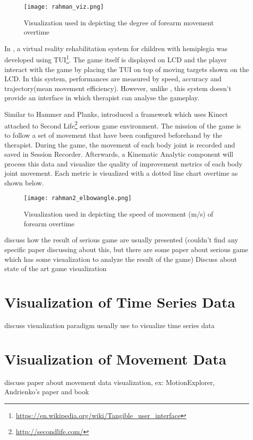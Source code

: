 \begin{figure}
\centering
\texttt{[image: rahman\_viz.png]}
\caption{Visualization used in \cite{rahman} depicting the degree of forearm movement overtime}
\end{figure}

In \cite{green}, a virtual reality rehabilitation system for children with hemiplegia was developed using TUI\footnote{\url{https://en.wikipedia.org/wiki/Tangible_user_interface}}. The game itself is displayed on LCD and the player interact with the game by placing the TUI on top of moving targets shown on the LCD. In this system, performances are measured by speed, accuracy and trajectory(mean movement efficiency). However, unlike \cite{rahman}, this system doesn't provide an interface in which therapist can analyse the gameplay.

Similar to Hammer and Planks, \cite{rahman2} introduced a framework which uses Kinect attached to Second Life\footnote{\url{http://secondlife.com/}} serious game environment. The mission of the game is to follow a set of movement that have been configured beforehand by the therapist. During the game, the movement of each body joint  is recorded and saved in Session Recorder. Afterwards, a Kinematic Analytic component will process this data and visualize the quality of improvement metrics of each body joint movement. Each metric is visualized with a dotted line chart overtime as shown below.

\begin{figure}
\centering
\texttt{[image: rahman2\_elbowangle.png]}
\caption{Visualization used in \cite{rahman2} depicting the speed of movement (m/s) of forearm overtime}
\end{figure}

discuss how the result of serious game are usually presented (couldn't find any specific paper discussing about this, but there are some paper about serious game which has some visualization to analyze the result of the game)
Discuss about state of the art game visualization

\section{Visualization of Time Series Data}
discuss visualization paradigm usually use to visualize time series data
\section{Visualization of Movement Data}
discuss paper about movement data visualization, ex: MotionExplorer, Andrienko's paper and book

